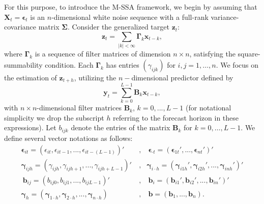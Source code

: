 \documentclass[11pt,a4paper]{article}
\begin{document}
For this purpose, to introduce the M-SSA framework, we begin by assuming that $\mathbf{X}_t=\boldsymbol{\epsilon}_t$ is an $n$-dimensional white noise sequence with a full-rank variance-covariance matrix $\boldsymbol{\Sigma}$.
Consider the generalized target $\mathbf{z}_t$:
\[
\mathbf{z}_t=\sum_{|k|<\infty}\boldsymbol{\Gamma}_k\mathbf{x}_{t-k},
\] 
where $\boldsymbol{\Gamma}_k$ is a sequence of filter matrices of dimension $n\times n$, satisfying the square-summability condition. Each $\boldsymbol{\Gamma}_k$ has entries $(\gamma_{ijk})$ for $i, j = 1, \ldots, n$. We focus on the estimation of $\mathbf{z}_{t+h}$, utilizing the $n-$dimensional predictor defined by
\[
\mathbf{y}_t = \sum_{k=0}^{L-1} \mathbf{B}_k \mathbf{x}_{t-k},
\]
with $n\times n$-dimensional filter matrices $\mathbf{B}_k$, $k=0,...,L-1$ (for notational simplicity we drop the subscript $h$ referring to the forecast horizon in these expressions). Let $b_{ijk}$ denote the entries of the matrix $\mathbf{B}_k$ for $k = 0, \ldots, L-1$. We define several vector notations as follows:
\begin{eqnarray*}
\boldsymbol{\epsilon}_{it}=(\epsilon_{it},\epsilon_{it-1},...,\epsilon_{it-(L-1)})'~&,&~\boldsymbol{\epsilon}_{\cdot t}=(\boldsymbol{\epsilon}_{1t}',...,\boldsymbol{\epsilon}_{nt}')'\\
\boldsymbol{\gamma}_{ijh}=(\gamma_{ijh},\gamma_{ijh+1},...,\gamma_{ijh+L-1})'~&,&\boldsymbol{\gamma}_{i\cdot h}=(\boldsymbol{\gamma}_{i1h}',\boldsymbol{\gamma}_{i2h}',...,\boldsymbol{\gamma}_{inh}')'\\
~\mathbf{b}_{ij}=(b_{ij0},b_{ij1},...,b_{ijL-1})'~&,&~\mathbf{b}_{i}=(\mathbf{b}_{i1}',\mathbf{b}_{i2}',...,\mathbf{b}_{in}')'\\
\boldsymbol{\gamma}_{h}=(\boldsymbol{\gamma}_{1\cdot h},\boldsymbol{\gamma}_{2\cdot h},...,\boldsymbol{\gamma}_{n\cdot h})
~&,&~\mathbf{b}=(\mathbf{b}_1,...,\mathbf{b}_n).%
\end{eqnarray*} 
\end{document}
